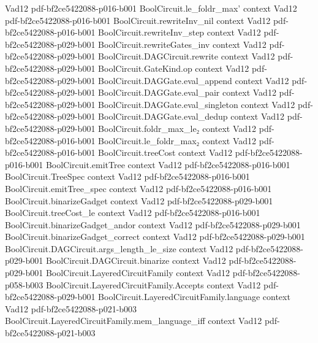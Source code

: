 \begin{theorem}
  {Vad12}
  {pdf-bf2ce5422088-p016-b001}
\proofstep
  {BoolCircuit.le_foldr_max'}
  {context}
  {Vad12}
  {pdf-bf2ce5422088-p016-b001}
\proofstep
  {BoolCircuit.rewriteInv_nil}
  {context}
  {Vad12}
  {pdf-bf2ce5422088-p016-b001}
\proofstep
  {BoolCircuit.rewriteInv_step}
  {context}
  {Vad12}
  {pdf-bf2ce5422088-p029-b001}
\proofstep
  {BoolCircuit.rewriteGates_inv}
  {context}
  {Vad12}
  {pdf-bf2ce5422088-p029-b001}
\proofstep
  {BoolCircuit.DAGCircuit.rewrite}
  {context}
  {Vad12}
  {pdf-bf2ce5422088-p029-b001}
\proofstep
  {BoolCircuit.GateKind.op}
  {context}
  {Vad12}
  {pdf-bf2ce5422088-p029-b001}
\proofstep
  {BoolCircuit.DAGGate.eval_append}
  {context}
  {Vad12}
  {pdf-bf2ce5422088-p029-b001}
\proofstep
  {BoolCircuit.DAGGate.eval_pair}
  {context}
  {Vad12}
  {pdf-bf2ce5422088-p029-b001}
\proofstep
  {BoolCircuit.DAGGate.eval_singleton}
  {context}
  {Vad12}
  {pdf-bf2ce5422088-p029-b001}
\proofstep
  {BoolCircuit.DAGGate.eval_dedup}
  {context}
  {Vad12}
  {pdf-bf2ce5422088-p029-b001}
\proofstep
  {BoolCircuit.foldr_max_le₂}
  {context}
  {Vad12}
  {pdf-bf2ce5422088-p016-b001}
\proofstep
  {BoolCircuit.le_foldr_max₂}
  {context}
  {Vad12}
  {pdf-bf2ce5422088-p016-b001}
\proofstep
  {BoolCircuit.treeCost}
  {context}
  {Vad12}
  {pdf-bf2ce5422088-p016-b001}
\proofstep
  {BoolCircuit.emitTree}
  {context}
  {Vad12}
  {pdf-bf2ce5422088-p016-b001}
\proofstep
  {BoolCircuit.TreeSpec}
  {context}
  {Vad12}
  {pdf-bf2ce5422088-p016-b001}
\proofstep
  {BoolCircuit.emitTree_spec}
  {context}
  {Vad12}
  {pdf-bf2ce5422088-p016-b001}
\proofstep
  {BoolCircuit.binarizeGadget}
  {context}
  {Vad12}
  {pdf-bf2ce5422088-p029-b001}
\proofstep
  {BoolCircuit.treeCost_le}
  {context}
  {Vad12}
  {pdf-bf2ce5422088-p016-b001}
\proofstep
  {BoolCircuit.binarizeGadget_andor}
  {context}
  {Vad12}
  {pdf-bf2ce5422088-p029-b001}
\proofstep
  {BoolCircuit.binarizeGadget_correct}
  {context}
  {Vad12}
  {pdf-bf2ce5422088-p029-b001}
\proofstep
  {BoolCircuit.DAGCircuit.args_length_le_size}
  {context}
  {Vad12}
  {pdf-bf2ce5422088-p029-b001}
\proofstep
  {BoolCircuit.DAGCircuit.binarize}
  {context}
  {Vad12}
  {pdf-bf2ce5422088-p029-b001}
\proofstep
  {BoolCircuit.LayeredCircuitFamily}
  {context}
  {Vad12}
  {pdf-bf2ce5422088-p058-b003}
\proofstep
  {BoolCircuit.LayeredCircuitFamily.Accepts}
  {context}
  {Vad12}
  {pdf-bf2ce5422088-p029-b001}
\proofstep
  {BoolCircuit.LayeredCircuitFamily.language}
  {context}
  {Vad12}
  {pdf-bf2ce5422088-p021-b003}
\proofstep
  {BoolCircuit.LayeredCircuitFamily.mem_language_iff}
  {context}
  {Vad12}
  {pdf-bf2ce5422088-p021-b003}

\end{theorem}
